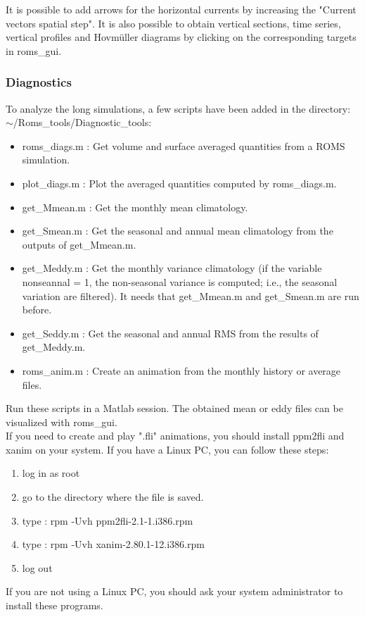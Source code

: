 It is possible to add arrows for the horizontal currents by increasing the "Current vectors 
spatial step". It is also possible to obtain vertical sections, time series, vertical profiles
and Hovm\"uller diagrams by clicking on the corresponding targets in roms\_gui.

\subsubsection{Diagnostics}

To analyze the long simulations,
a few scripts have been added in the directory: \\
$\sim$/Roms\_tools/Diagnostic\_tools:
\begin{itemize}
\item roms\_diags.m : Get volume and surface averaged quantities from a ROMS simulation.
\item plot\_diags.m :  Plot the averaged quantities computed by roms\_diags.m.
\item get\_Mmean.m  : Get the monthly mean climatology.
\item get\_Smean.m  : Get the seasonal and annual mean climatology from the outputs of
get\_Mmean.m.
\item get\_Meddy.m  : Get the monthly variance climatology (if the variable nonseannal = 1, 
the non-seasonal variance is computed; i.e., the seasonal variation are 
filtered). It needs that get\_Mmean.m and get\_Smean.m are run before.
\item get\_Seddy.m  : Get the seasonal and annual RMS from the results of 
get\_Meddy.m.
\item roms\_anim.m  : Create an animation from the monthly  history or average files.
\end{itemize}
Run these scripts in a Matlab session.
The obtained mean or eddy files can be visualized with roms\_gui.\\

If you need to create and play ".fli" animations, you should install ppm2fli
and xanim on your system. If you have a Linux PC, you can follow these steps:
\begin{enumerate}
\item log in as root
\item go to the directory where the file is saved.
\item type : rpm -Uvh  ppm2fli-2.1-1.i386.rpm
\item type : rpm -Uvh  xanim-2.80.1-12.i386.rpm
\item log out
\end{enumerate}
If you are not using a Linux PC, you should ask your 
system administrator to install these programs.\\
